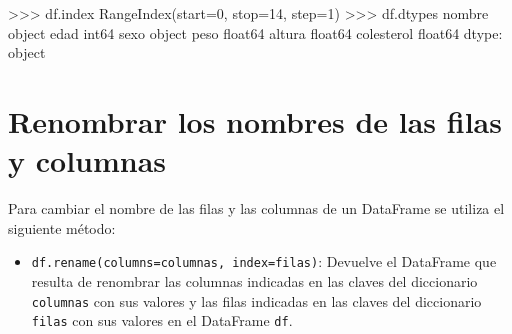 \documentclass[
  spanish,
  a4paper,
]{scrreport}
\newenvironment{Shaded}{\begin{snugshade}}{\end{snugshade}}
\newcommand{\BuiltInTok}[1]{\textcolor[rgb]{0.00,0.23,0.31}{#1}}
\newcommand{\DecValTok}[1]{\textcolor[rgb]{0.68,0.00,0.00}{#1}}
\newcommand{\NormalTok}[1]{\textcolor[rgb]{0.00,0.23,0.31}{#1}}
\newcommand{\OperatorTok}[1]{\textcolor[rgb]{0.37,0.37,0.37}{#1}}
\providecommand{\tightlist}{%
  \setlength{\itemsep}{0pt}\setlength{\parskip}{0pt}}
\begin{document}
\begin{Shaded}
\begin{Highlighting}[]
\OperatorTok{\textgreater{}\textgreater{}\textgreater{}}\NormalTok{ df.index}
\NormalTok{RangeIndex(start}\OperatorTok{=}\DecValTok{0}\NormalTok{, stop}\OperatorTok{=}\DecValTok{14}\NormalTok{, step}\OperatorTok{=}\DecValTok{1}\NormalTok{)}
\OperatorTok{\textgreater{}\textgreater{}\textgreater{}}\NormalTok{ df.dtypes}
\NormalTok{nombre         }\BuiltInTok{object}
\NormalTok{edad            int64}
\NormalTok{sexo           }\BuiltInTok{object}
\NormalTok{peso          float64}
\NormalTok{altura        float64}
\NormalTok{colesterol    float64}
\NormalTok{dtype: }\BuiltInTok{object}
\end{Highlighting}
\end{Shaded}

\section{Renombrar los nombres de las filas y
columnas}\label{renombrar-los-nombres-de-las-filas-y-columnas}

Para cambiar el nombre de las filas y las columnas de un DataFrame se
utiliza el siguiente método:

\begin{itemize}
\tightlist
\item
  \texttt{df.rename(columns=columnas,\ index=filas)}: Devuelve el
  DataFrame que resulta de renombrar las columnas indicadas en las
  claves del diccionario \texttt{columnas} con sus valores y las filas
  indicadas en las claves del diccionario \texttt{filas} con sus valores
  en el DataFrame \texttt{df}.
\end{itemize}
\end{document}
